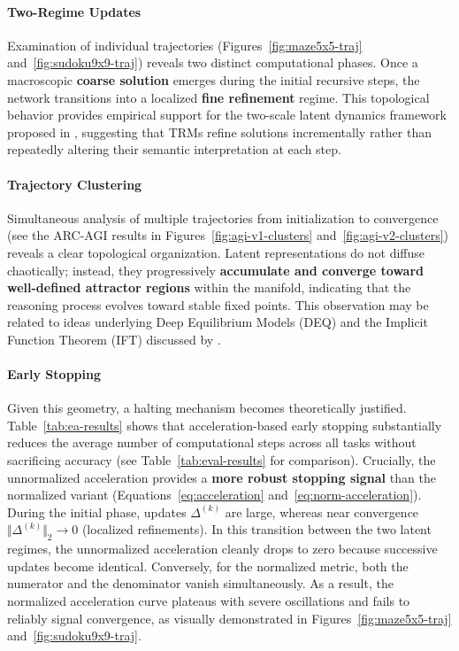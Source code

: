 \documentclass{article}
\begin{document}
\paragraph{Two-Regime Updates}
Examination of individual trajectories (Figures~\ref{fig:maze5x5-traj} and~\ref{fig:sudoku9x9-traj}) reveals two distinct computational phases.
Once a macroscopic \textbf{coarse solution} emerges during the initial recursive steps, the network transitions into a localized \textbf{fine refinement} regime.
This topological behavior provides empirical support for the two-scale latent dynamics framework proposed in \cite{latent-dynamics}, suggesting that TRMs refine solutions incrementally rather than repeatedly altering their semantic interpretation at each step.

\paragraph{Trajectory Clustering}
Simultaneous analysis of multiple trajectories from initialization to convergence (see the ARC-AGI results in Figures~\ref{fig:agi-v1-clusters} and~\ref{fig:agi-v2-clusters}) reveals a clear topological organization.
Latent representations do not diffuse chaotically; instead, they progressively \textbf{accumulate and converge toward well-defined attractor regions} within the manifold, indicating that the reasoning process evolves toward stable fixed points.
This observation may be related to ideas underlying Deep Equilibrium Models (DEQ) \cite{deq} and the Implicit Function Theorem (IFT) discussed by \citet{hrm}.

\paragraph{Early Stopping}
Given this geometry, a halting mechanism becomes theoretically justified.
Table~\ref{tab:ea-results} shows that acceleration-based early stopping substantially reduces the average number of computational steps across all tasks without sacrificing accuracy (see Table~\ref{tab:eval-results} for comparison).
Crucially, the unnormalized acceleration provides a \textbf{more robust stopping signal} than the normalized variant (Equations~\ref{eq:acceleration} and~\ref{eq:norm-acceleration}).
During the initial phase, updates $\Delta^{(k)}$ are large, whereas near convergence $\Vert \Delta^{(k)} \Vert_2 \rightarrow 0$ (localized refinements).
In this transition between the two latent regimes, the unnormalized acceleration cleanly drops to zero because successive updates become identical.
Conversely, for the normalized metric, both the numerator and the denominator vanish simultaneously. As a result, the normalized acceleration curve plateaus with severe oscillations and fails to reliably signal convergence, as visually demonstrated in Figures~\ref{fig:maze5x5-traj} and~\ref{fig:sudoku9x9-traj}.
\end{document}
